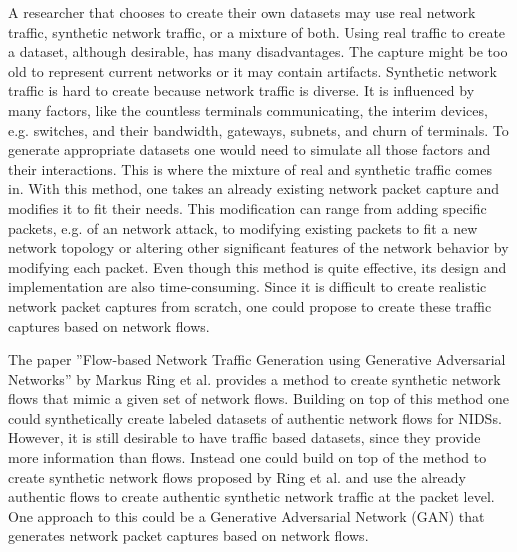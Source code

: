 \documentclass[
	ngerman,
	ruledheaders=section,%
	class=report,%
	thesis={type=bachelor},%
	accentcolor=9c,%
	custommargins=true,%
	marginpar=false,%
	parskip=half-,%
	fontsize=11pt,%
]{tudapub}
\begin{document}
A researcher that chooses to create their own datasets may use real network traffic, synthetic network traffic, or a mixture of both.
Using real traffic to create a dataset, although desirable, has many disadvantages.
The capture might be too old to represent current networks or
it may contain artifacts.
Synthetic network traffic is hard to create because network traffic is diverse.
It is influenced by many factors, like
the countless terminals communicating,
the interim devices, e.g. switches, and their bandwidth,
gateways, subnets, and churn of terminals.
To generate appropriate datasets one would need to simulate all those factors and their interactions.
This is where the mixture of real and synthetic traffic comes in.
With this method, one takes an already existing network packet capture and modifies it to fit their needs.
This modification can range from adding specific packets, e.g. of an network attack\cite{corderoID2TDIYDataset2015},
to modifying existing packets to fit a new network topology
or altering other significant features of the network behavior by modifying each packet.
Even though this method is quite effective, its design and implementation are also time-consuming.
Since it is difficult to create realistic network packet captures from scratch,
one could propose to create these traffic captures based on network flows.

The paper ''Flow-based Network Traffic Generation using Generative Adversarial Networks'' by Markus Ring et al. \cite{ringFlowbasedNetworkTraffic2019a} provides a method to create synthetic network flows that mimic a given set of network flows.
Building on top of this method one could synthetically create labeled datasets of authentic network flows for NIDSs.
However, it is still desirable to have traffic based datasets, since they provide more information than flows.
Instead one could build on top of the method to create synthetic network flows proposed by Ring et al. \cite{ringFlowbasedNetworkTraffic2019a} and
use the already authentic flows to create authentic synthetic network traffic at the packet level.
One approach to this could be a Generative Adversarial Network (GAN) that generates network packet captures based on network flows.
\end{document}
